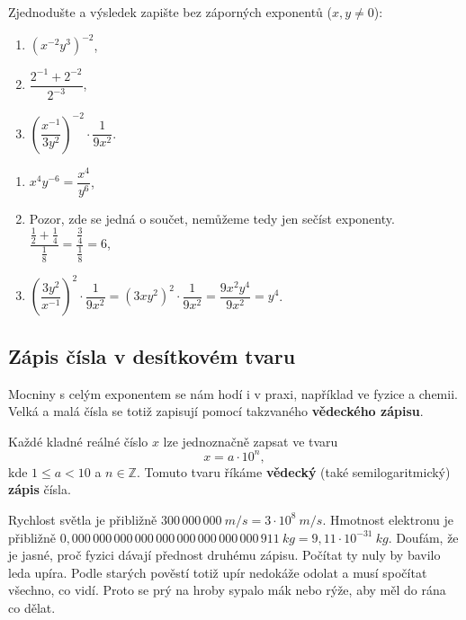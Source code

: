 \begin{problem}
  Zjednodušte a výsledek zapište bez záporných exponentů ($x, y \neq 0$):
  \begin{enumerate}[label=(\alph*)]
    \item ${(x^{-2}y^3)}^{-2}$,
    \item $\dfrac{2^{-1} + 2^{-2}}{2^{-3}}$,
    \item ${\left(\dfrac{x^{-1}}{3y^{2}}\right)}^{-2}\cdot\dfrac{1}{9x^{2}}$.
  \end{enumerate}
\end{problem}

\begin{solution}
  \begin{enumerate}[label=(\alph*)]
    \item $x^{4}y^{-6} = \dfrac{x^4}{y^6}$,
    \item Pozor, zde se jedná o součet, nemůžeme tedy jen sečíst exponenty. $\dfrac{\frac{1}{2} + \frac{1}{4}}{\frac{1}{8}} = \dfrac{\frac{3}{4}}{\frac{1}{8}} = 6$,
    \item ${\left(\dfrac{3y^2}{x^{-1}}\right)}^{2}\cdot\dfrac{1}{9x^2} = {(3xy^2)}^2\cdot\dfrac{1}{9x^2} = \dfrac{9x^2y^4}{9x^2} = y^4$.
  \end{enumerate}
\end{solution}

\subsection{Zápis čísla v desítkovém tvaru}

Mocniny s celým exponentem se nám hodí i v praxi, například ve fyzice a chemii. Velká a malá čísla se totiž zapisují pomocí takzvaného \textbf{vědeckého zápisu}.

\begin{definitionbox}
  Každé kladné reálné číslo $x$ lze jednoznačně zapsat ve tvaru
  \begin{equation*}
    x = a\cdot 10^n,
  \end{equation*}
  kde $1\leq a < 10$ a $n\in\mathbb{Z}$. Tomuto tvaru říkáme \textbf{vědecký} (také semilogaritmický) \textbf{zápis} čísla.
\end{definitionbox}

\begin{example}
  Rychlost světla je přibližně $300\,000\,000\ \si{m/s} = 3\cdot 10^8\ \si{m/s}$. Hmotnost elektronu je přibližně $0{,}000\,000\,000\,000\,000\,000\,000\,000\,000\,911\ \si{kg} = 9{,}11\cdot 10^{-31}\ \si{kg}$. Doufám, že je jasné, proč fyzici dávají přednost druhému zápisu. Počítat ty nuly by bavilo leda upíra. Podle starých pověstí totiž upír nedokáže odolat a musí spočítat všechno, co vidí. Proto se prý na hroby sypalo mák nebo rýže, aby měl do rána co dělat.
\end{example}

